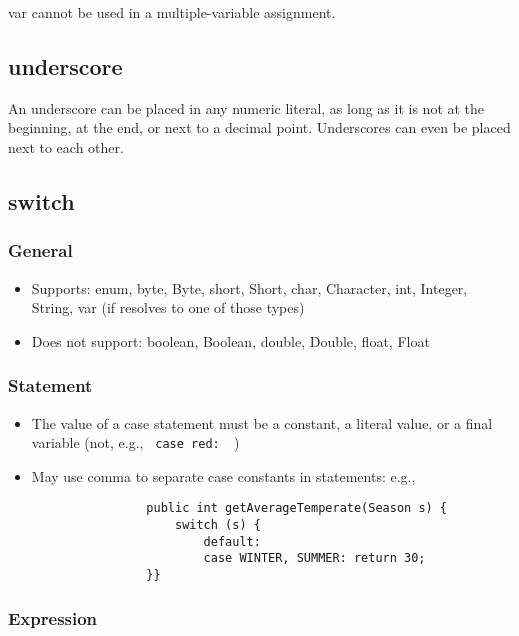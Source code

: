 \documentclass{scrartcl}
\begin{document}
    var cannot be used in a multiple-­variable assignment.

\subsection{underscore}

    An underscore can be placed in any numeric literal, as long as it is not at the beginning, at the end, or next to a decimal point. Underscores can even be placed next to each other.

\subsection{switch}

\subsubsection{General}

        \begin{itemize}
            \item Supports: enum, byte, Byte, short, Short, char, Character, int, Integer,
            String, var (if resolves to one of those types)
            \item Does not support: boolean, Boolean, double, Double, float, Float
         \end{itemize}

\subsubsection{Statement}

    \begin{itemize}
        \item The value of a case statement must be a constant, a literal value, or a final variable (not, e.g., \lstinline$ case red:  $)
        \item May use comma to separate case constants in statements: e.g.,
            \begin{lstlisting}
                public int getAverageTemperate(Season s) {
                    switch (s) {
                        default:
                        case WINTER, SUMMER: return 30;
                }}
            \end{lstlisting}
    \end{itemize}

\subsubsection{Expression}
\end{document}
